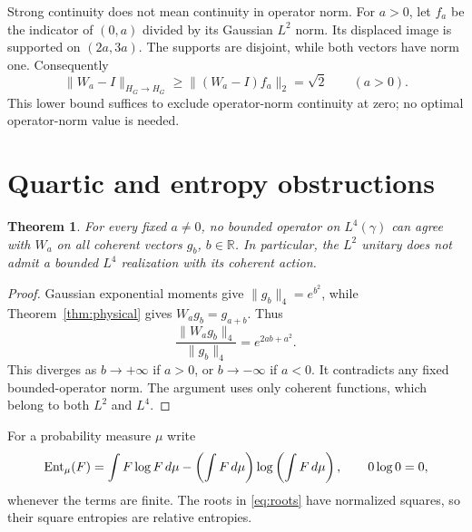 \documentclass[11pt]{article}
\newtheorem{theorem}{Theorem}[section]
\newcommand{\R}{\mathbb R}\newcommand{\N}{\mathbb N}
\begin{document}
Strong continuity does not mean continuity in operator norm.
For $a>0$, let $f_a$ be the indicator of $(0,a)$ divided by its
Gaussian $L^2$ norm. Its displaced image is supported on $(2a,3a)$.
The supports are disjoint, while both vectors have norm one. Consequently
\begin{equation}\label{eq:normdiscontinuity}
 \|W_a-I\|_{H_G\to H_G}\geq\|(W_a-I)f_a\|_2=\sqrt2
 \qquad(a>0).
\end{equation}
This lower bound suffices to exclude operator-norm continuity at zero;
no optimal operator-norm value is needed.

\section{Quartic and entropy obstructions}
\begin{theorem}\label{thm:L4}
For every fixed $a\ne0$, no bounded operator on $L^4(\gamma)$ can
agree with $W_a$ on all coherent vectors $g_b$, $b\in\R$.
In particular, the $L^2$ unitary does not admit a bounded $L^4$
realization with its coherent action.
\end{theorem}
\begin{proof}
Gaussian exponential moments give $\|g_b\|_4=e^{b^2}$, while
Theorem~\ref{thm:physical} gives $W_ag_b=g_{a+b}$. Thus
\[
 \frac{\|W_ag_b\|_4}{\|g_b\|_4}
 =e^{2ab+a^2}.
\]
This diverges as $b\to+\infty$ if $a>0$, or $b\to-\infty$ if $a<0$.
It contradicts any fixed bounded-operator norm. The argument uses only
coherent functions, which belong to both $L^2$ and $L^4$.
\end{proof}

For a probability measure $\mu$ write
\[
 \operatorname{Ent}_\mu(F)=\int F\log F\,d\mu
 -\left(\int F\,d\mu\right)\log\left(\int F\,d\mu\right),
 \qquad 0\log0=0,
\]
whenever the terms are finite. The roots in \eqref{eq:roots} have
normalized squares, so their square entropies are relative entropies.
\end{document}
